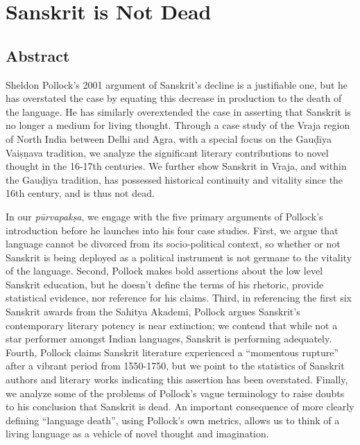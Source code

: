 \chapter{Sanskrit is Not Dead}\label{chapter5}


\section*{Abstract}

Sheldon Pollock’s 2001 argument of Sanskrit’s decline is a justifiable one, but he has overstated the case by equating this decrease in production to the death of the language.  He has similarly overextended the case in asserting that Sanskrit is no longer a medium for living thought.  Through a case study of the Vraja region of North India between Delhi and Agra, with a special focus on the Gauḍīya Vaiṣṇava tradition, we analyze the significant literary contributions to novel thought in the 16-17th centuries.  We further show Sanskrit in Vraja, and within the Gauḍiya tradition, has possessed historical continuity and vitality since the 16th century, and is thus not dead. 

In our {\sl pūrvapakṣa}, we engage with the five primary arguments of Pollock’s introduction before he launches into his four case studies.  First, we argue that language cannot be divorced from its socio-political context, so whether or not Sanskrit is being deployed as a political instrument is not germane to the vitality of the language.  Second, Pollock makes bold assertions about the low level Sanskrit education, but he doesn’t define the terms of his rhetoric, provide statistical evidence, nor reference for his claims.  Third, in referencing the first six Sanskrit awards from the Sahitya Akademi, Pollock argues Sanskrit’s contemporary literary potency is near extinction; we contend that while not a star performer amongst Indian languages, Sanskrit is performing adequately.  Fourth, Pollock claims Sanskrit literature experienced a “momentous rupture” after a vibrant period from 1550-1750, but we point to the statistics of Sanskrit authors and literary works indicating this assertion has been overstated.  Finally, we analyze some of the problems of Pollock’s vague terminology to raise doubts to his conclusion that Sanskrit is dead.  An important consequence of more clearly defining “language death”, using Pollock’s own metrics, allows us to think of a living language as a vehicle of novel thought and imagination.    

